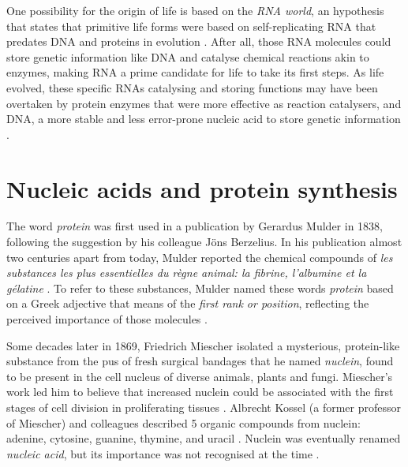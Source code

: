 One possibility for the origin of life is based on the \emph{RNA world}, an hypothesis that states that primitive life forms were based on self-replicating RNA that predates DNA and proteins in evolution \cite{gilbert:1986td,alberts:2008vj,sharp:1985th}. After all, those RNA molecules could store genetic information like DNA and catalyse chemical reactions akin to enzymes, making RNA a prime candidate for life to take its first steps. As life evolved, these specific RNAs catalysing and storing functions may have been overtaken by protein enzymes that were more effective as reaction catalysers, and DNA, a more stable and less error-prone nucleic acid to store genetic information \cite{gilbert:1986td,alberts:2008vj}.





\section{Nucleic acids and protein synthesis}

The word \emph{protein} was first used in a publication by Gerardus Mulder in 1838, following the suggestion by his colleague Jöns Berzelius. In his publication almost two centuries apart from today, Mulder reported the chemical compounds of \emph{les substances les plus essentielles du règne animal: la fibrine, l'albumine et la gélatine} \cite{mulder:1838uy}. %
To refer to these substances, Mulder named these words \emph{protein} based on a Greek adjective that means of the \emph{first rank or position}, reflecting the perceived importance of those molecules \cite{mulder:1838uy,vickery:1950ur}.


Some decades later in 1869, Friedrich Miescher isolated a mysterious, protein-like substance from the pus of fresh surgical bandages that he named \emph{nuclein}, found to be present in the cell nucleus of diverse animals, plants and fungi. Miescher's work led him to believe that increased nuclein could be associated with the first stages of cell division in proliferating tissues \cite{dahm:2005wx}. Albrecht Kossel (a former professor of Miescher) and colleagues described 5 organic compounds from nuclein: adenine, cytosine, guanine, thymine, and uracil \cite{kossel:1885tj,kossel:1893ws,kossel:1894vy,ascoli:1901ti}. Nuclein was eventually renamed \emph{nucleic acid}, but its importance was not recognised at the time \cite{dahm:2005wx}.

